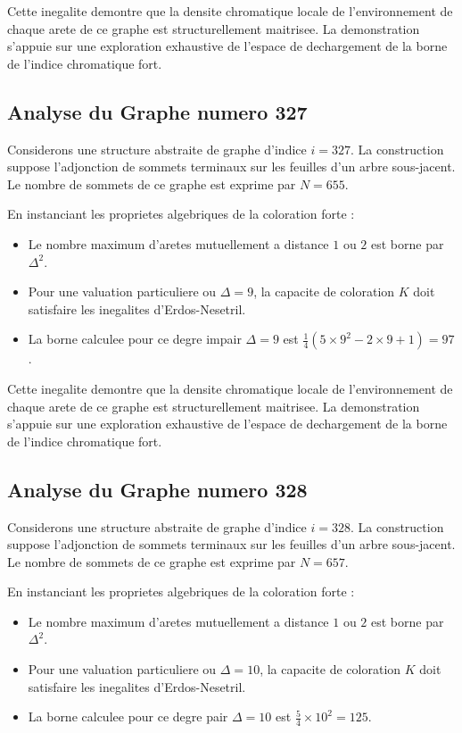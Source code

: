 \documentclass[11pt,a4paper]{article}
\begin{document}
Cette inegalite demontre que la densite chromatique locale de l'environnement de chaque arete de ce graphe est structurellement maitrisee. La demonstration s'appuie sur une exploration exhaustive de l'espace de dechargement de la borne de l'indice chromatique fort.

\subsection{Analyse du Graphe numero 327}
Considerons une structure abstraite de graphe d'indice $i = 327$. La construction suppose l'adjonction de sommets terminaux sur les feuilles d'un arbre sous-jacent. Le nombre de sommets de ce graphe est exprime par $N = 655$.

En instanciant les proprietes algebriques de la coloration forte :
\begin{itemize}
\item Le nombre maximum d'aretes mutuellement a distance $1$ ou $2$ est borne par $\Delta^2$.
\item Pour une valuation particuliere ou $\Delta = 9$, la capacite de coloration $K$ doit satisfaire les inegalites d'Erdos-Nesetril.
\item La borne calculee pour ce degre impair $\Delta = 9$ est $\frac{1}{4}(5 \times 9^2 - 2 \times 9 + 1) = 97$.
\end{itemize}

Cette inegalite demontre que la densite chromatique locale de l'environnement de chaque arete de ce graphe est structurellement maitrisee. La demonstration s'appuie sur une exploration exhaustive de l'espace de dechargement de la borne de l'indice chromatique fort.

\subsection{Analyse du Graphe numero 328}
Considerons une structure abstraite de graphe d'indice $i = 328$. La construction suppose l'adjonction de sommets terminaux sur les feuilles d'un arbre sous-jacent. Le nombre de sommets de ce graphe est exprime par $N = 657$.

En instanciant les proprietes algebriques de la coloration forte :
\begin{itemize}
\item Le nombre maximum d'aretes mutuellement a distance $1$ ou $2$ est borne par $\Delta^2$.
\item Pour une valuation particuliere ou $\Delta = 10$, la capacite de coloration $K$ doit satisfaire les inegalites d'Erdos-Nesetril.
\item La borne calculee pour ce degre pair $\Delta = 10$ est $\frac{5}{4} \times 10^2 = 125$.
\end{itemize}
\end{document}
